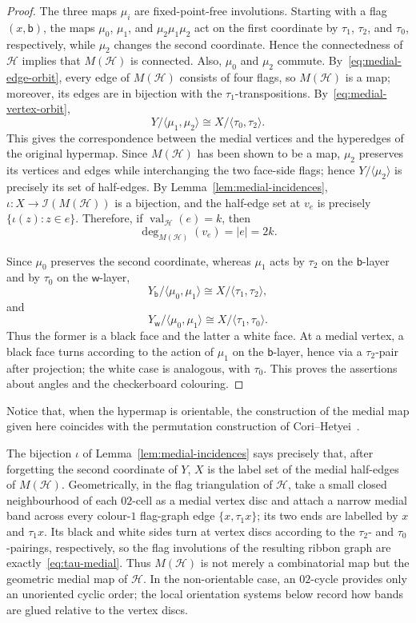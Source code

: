 \documentclass{article}
\theoremstyle{definition}
\theoremstyle{remark}
\newcommand{\Hcal}{\mathcal{H}}
\newcommand{\val}{\operatorname{val}}
\begin{document}
\begin{proof}
The three maps $\mu_i$ are fixed-point-free involutions. Starting with a flag $(x,\mathsf b)$, the maps $\mu_0$, $\mu_1$, and $\mu_2\mu_1\mu_2$ act on the first coordinate by $\tau_1$, $\tau_2$, and $\tau_0$, respectively, while $\mu_2$ changes the second coordinate. Hence the connectedness of $\Hcal$ implies that $M(\Hcal)$ is connected. Also, $\mu_0$ and $\mu_2$ commute. By~\eqref{eq:medial-edge-orbit}, every edge of $M(\Hcal)$ consists of four flags, so $M(\Hcal)$ is a map; moreover, its edges are in bijection with the $\tau_1$-transpositions. By~\eqref{eq:medial-vertex-orbit},
\[
 Y/\langle\mu_1,\mu_2\rangle
 \cong X/\langle\tau_0,\tau_2\rangle.
\]
This gives the correspondence between the medial vertices and the hyperedges of the original hypermap. Since $M(\Hcal)$ has been shown to be a map, $\mu_2$ preserves its vertices and edges while interchanging the two face-side flags; hence
$Y/\langle\mu_2\rangle$ is precisely its set of half-edges. By Lemma~\ref{lem:medial-incidences}, $\iota:X\to\mathcal I(M(\Hcal))$ is a bijection, and the half-edge set at $v_e$ is precisely $\{\iota(z):z\in e\}$. Therefore, if $\val_{\Hcal}(e)=k$, then
\[
  \deg_{M(\Hcal)}(v_e)=|e|=2k.
\]

Since $\mu_0$ preserves the second coordinate, whereas $\mu_1$ acts by $\tau_2$ on the $\mathsf b$-layer and by $\tau_0$ on the $\mathsf w$-layer,
\[
 Y_{\mathsf b}/\langle\mu_0,\mu_1\rangle
 \cong X/\langle\tau_1,\tau_2\rangle,
\]
and
\[
 Y_{\mathsf w}/\langle\mu_0,\mu_1\rangle
 \cong X/\langle\tau_1,\tau_0\rangle.
\]
Thus the former is a black face and the latter a white face. At a medial vertex, a black face turns according to the action of $\mu_1$ on the $\mathsf b$-layer, hence via a $\tau_2$-pair after projection; the white case is analogous, with $\tau_0$. This proves the assertions about angles and the checkerboard colouring. 
\end{proof}
Notice that, when the hypermap is orientable, the construction of the medial map given here coincides with the permutation construction of Cori--Hetyei~\cite[Definition~3.1]{CoriHetyei2025}.

The bijection $\iota$ of Lemma~\ref{lem:medial-incidences} says precisely that, after forgetting the second coordinate of $Y$, $X$ is the label set of the medial half-edges of $M(\Hcal)$. Geometrically, in the flag triangulation of $\Hcal$, take a small closed neighbourhood of each $02$-cell as a medial vertex disc and attach a narrow medial band across every colour-$1$ flag-graph edge $\{x,\tau_1x\}$; its two ends are labelled by $x$ and $\tau_1x$. Its black and white sides turn at vertex discs according to the $\tau_2$- and $\tau_0$-pairings, respectively, so the flag involutions of the resulting ribbon graph are exactly~\eqref{eq:tau-medial}. Thus $M(\Hcal)$ is not merely a combinatorial map but the geometric medial map of $\Hcal$. In the non-orientable case, an $02$-cycle provides only an unoriented cyclic order; the local orientation systems below record how bands are glued relative to the vertex discs.
\end{document}

